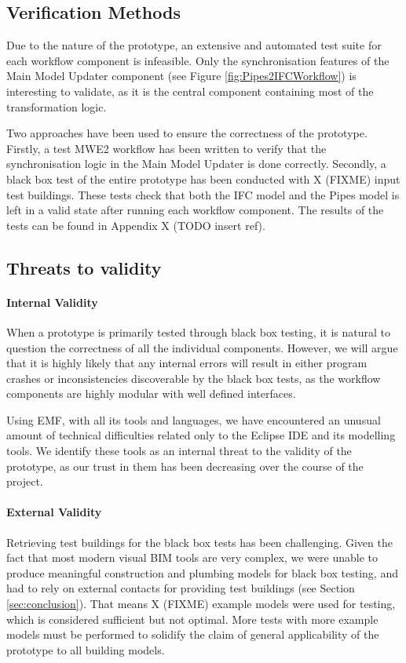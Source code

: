 \subsection{Verification Methods}
\label{subsec:verification_methods}
Due to the nature of the prototype, an extensive and automated test suite for each workflow component is infeasible. Only the synchronisation features of the Main Model Updater component (see Figure \ref{fig:Pipes2IFCWorkflow}) is interesting to validate, as it is the central component containing most of the transformation logic.

Two approaches have been used to ensure the correctness of the prototype. Firstly, a test MWE2 workflow has been written to verify that the synchronisation logic in the Main Model Updater is done correctly. Secondly, a black box test of the entire prototype has been conducted with X (FIXME) input test buildings. These tests check that both the IFC model and the Pipes model is left in a valid state after running each workflow component. The results of the tests can be found in Appendix X (TODO insert ref).

\subsection{Threats to validity}
\paragraph{Internal Validity} When a prototype is primarily tested through black box testing, it is natural to question the correctness of all the individual components. However, we will argue that it is highly likely that any internal errors will result in either program crashes or inconsistencies discoverable by the black box tests, as the workflow components are highly modular with well defined interfaces.

Using EMF, with all its tools and languages, we have encountered an unusual amount of technical difficulties related only to the Eclipse IDE and its modelling tools. We identify these tools as an internal threat to the validity of the prototype, as our trust in them has been decreasing over the course of the project.

\paragraph{External Validity} Retrieving test buildings for the black box tests has been challenging. Given the fact that most modern visual BIM tools are very complex, we were unable to produce meaningful construction and plumbing models for black box testing, and had to rely on external contacts for providing test buildings (see Section \ref{sec:conclusion}). That means X (FIXME) example models were used for testing, which is considered sufficient but not optimal. More tests with more example models must be performed to solidify the claim of general applicability of the prototype to all building models.

